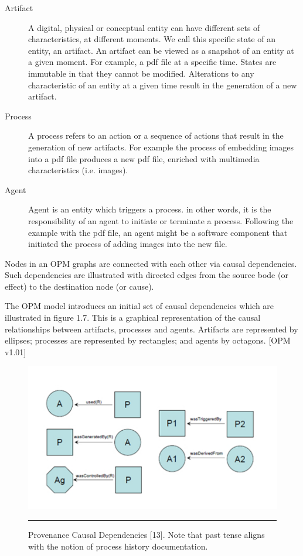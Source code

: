 \begin{description}
  \item[Artifact] 
         A digital, physical or conceptual entity can have different sets of characteristics, at different moments. We call this specific state of an entity, an artifact. An artifact can be viewed as a snapshot of an entity at a given moment. For example, a pdf file at a specific time. States are immutable in that they cannot be modified. Alterations to any characteristic of an entity at a given time result in the generation of a new artifact.
  \item[Process] 
        A process refers to an action or a sequence of actions that result in the generation of new artifacts. For example the process of embedding images into a pdf file produces a new pdf file, enriched with multimedia characteristics (i.e. images).
  \item[Agent] 
        Agent is an entity which triggers a process. in other words, it is the responsibility of an agent to initiate or terminate a process. Following the example with the pdf file, an agent might be a software component that initiated the process of adding images into the new file.
\end{description}

Nodes in an OPM graphs are connected with each other via causal dependencies. Such dependencies are illustrated with directed edges from the source bode (or effect) to the destination node (or cause).

The OPM model introduces an initial set of causal dependencies which are illustrated in figure 1.7. This is a graphical representation of the causal relationships between artifacts, processes and agents. Artifacts are represented by ellipses; processes are represented by rectangles; and agents by octagons. [OPM v1.01]

\begin{figure}[htbp]
	\centering
		\includegraphics{./Figures/figure7.pdf}
		\rule{35em}{0.5pt}
	\caption[Provenance Causal Dependencies]{Provenance Causal Dependencies [13]. Note that past tense aligns with the notion of process history documentation.}
	\label{fig:provCausalDependencies}
\end{figure}

